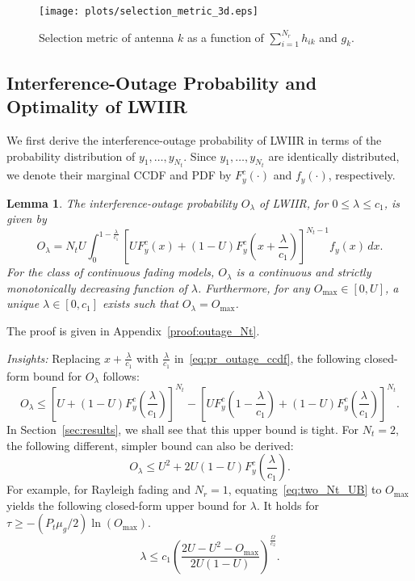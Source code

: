 \documentclass[12pt,draftcls,peerreview,onecolumn]{IEEEtran}
\newtheorem{lemma}{{\bf Lemma}}
\newcommand{\lam}{\lambda}
\newcommand{\mug}{{\mu_{g}}}
\newcommand{\Nt}{{N_t}}
\newcommand{\Nr}{{N_r}}
\newcommand{\Pt}{{P_t}}
\newcommand{\such}{h}
\newcommand{\puch}{g}
\newcommand{\hk}[1]{{\such_{#1}}}
\newcommand{\gk}[1]{{\puch_{#1}}}
\newcommand{\outmax}{O_{\text{max}}}
\newcommand{\itau}{\tau}
\newcommand{\cone}{c_{1}}
\newcommand{\ctwo}{c_{2}}
\newcommand{\out}{O}
\newcommand{\lambym}{\frac{\lam}{\cone}}
\newcommand{\yk}[1]{y_{#1}}
\newcommand{\al}{\ctwo}
\newcommand{\snr}{\Omega}
\newcommand{\snrbyal}[1][]{\frac{\snr#1}{\al}}
\newcommand{\un}{U}
\newcommand{\outlam}{\out_{\lam}}
\newcommand{\sumnr}{\sum_{i=1}^{\Nr}}
\begin{document}
\begin{figure}
\centering 
\texttt{[image: plots/selection\_metric\_3d.eps]}
\caption{Selection metric of antenna $k$ as a function of $\sumnr\hk{ik}$ and $\gk{k}$.}
\label{fig:metric}
\end{figure}

\subsection{Interference-Outage Probability and Optimality of LWIIR}
We first derive the interference-outage probability of LWIIR in terms of the probability distribution of $\yk{1},\ldots,\yk{\Nt}$. Since $\yk{1},\ldots,\yk{\Nt}$ are identically distributed, we denote their marginal CCDF and PDF by $F_{y}^{c}(\cdot)$ and $f_{y}(\cdot)$, respectively. 
\begin{lemma}
\label{lem:outage_Nt}
The interference-outage probability $\outlam$ of LWIIR, for $0\leq\lam\leq\cone$, is given by
\begin{equation}
\label{eq:pr_outage_ccdf} 
\outlam  =  \Nt\un \int_{0}^{1-\lambym} 	
\left[ \un F_{y}^{c}\left(x\right) + \left(1 -\un\right)F_{y}^{c}\left(x+\lambym\right) \right]^{\Nt-1} f_{y}(x)\,dx.
\end{equation}
For the class of continuous fading models, $\outlam$ is a continuous and strictly monotonically decreasing function of $\lam$. Furthermore, for any $\outmax\in[0,\un]$, a unique $\lam\in[0,\cone]$ exists such that $\outlam=\outmax$. 
\end{lemma}
%
\begin{IEEEproof}
    The proof is given in Appendix~\ref{proof:outage_Nt}.
\end{IEEEproof}
%

{\em Insights:} Replacing $x+\lambym$ with $\lambym$ in~\eqref{eq:pr_outage_ccdf}, the following closed-form bound for $\outlam$ follows: 
%
\begin{equation}
\label{eq:pr_outage_ub}
\outlam  \leq \left[ \un + \left(1-\un\right)F_{y}^{c}\left(\lambym\right)  \right]^{\Nt} - \left[ \un F_{y}^{c}\left(1-\lambym\right) + \left(1-\un\right)F_{y}^{c}\left(\lambym\right)  \right]^{\Nt}.
\end{equation}
%
In Section~\ref{sec:results}, we shall see that this upper bound is tight. For $\Nt = 2$, the following different, simpler bound can also be derived: 
%
\begin{equation}
\label{eq:two_Nt_UB}
\outlam \leq \un^2 + 2\un(1-\un)F_{y}^{c}\left(\lambym\right).
\end{equation}
For example, for Rayleigh fading and $\Nr=1$, equating~\eqref{eq:two_Nt_UB} to $\outmax$ yields the following closed-form upper bound for $\lam$. It holds for $\itau\geq-\left( \Pt\mug/{2}\right) \ln\left({\outmax}\right)$.
%
\begin{equation}
\label{eq:two_Nt_lam}
\lam \leq \cone \left( \frac{2\un - \un^2 - \outmax}{2\un(1-\un)} \right)^{\snrbyal[]}.
\end{equation} 
\end{document}
